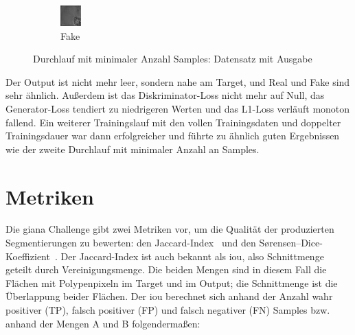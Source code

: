 \begin{figure}
\begin{subfigure}{.19\textwidth}
		\includegraphics[width=.9\linewidth,interpolate=false]{img/results/min_fake}
		\caption{Fake}
	\end{subfigure}
	\caption{Durchlauf mit minimaler Anzahl Samples: Datensatz mit Ausgabe}
	\label{fig:outputsminsamples}
\end{figure}

Der Output ist nicht mehr leer, sondern nahe am Target, und Real und Fake sind sehr ähnlich.
Außerdem ist das Diskriminator-Loss nicht mehr auf Null, das Generator-Loss tendiert zu niedrigeren Werten und das L1-Loss verläuft monoton fallend.
Ein weiterer Trainingslauf mit den vollen Trainingsdaten und doppelter Trainingsdauer war dann erfolgreicher und führte zu ähnlich guten Ergebnissen wie der zweite Durchlauf mit minimaler Anzahl an Samples.



\section{Metriken}

Die \gls{giana} Challenge gibt zwei Metriken vor, um die Qualität der produzierten Segmentierungen zu bewerten: den Jaccard-Index~\cite{Jaccard.1901} und den Sørensen–Dice-Koeffizient~\cite{Srensen.1948,Dice.1945}.
Der Jaccard-Index ist auch bekannt als \gls{iou}, also Schnittmenge geteilt durch Vereinigungsmenge.
Die beiden Mengen sind in diesem Fall die Flächen mit Polypenpixeln im Target und im Output; die Schnittmenge ist die Überlappung beider Flächen.
Der \gls{iou} berechnet sich anhand der Anzahl wahr positiver (TP), falsch positiver (FP) und falsch negativer (FN) Samples bzw. anhand der Mengen A und B folgendermaßen:

